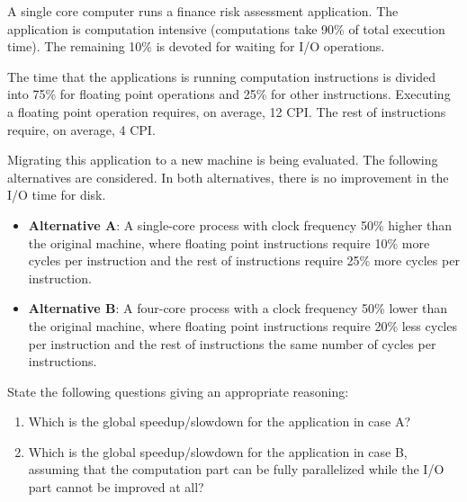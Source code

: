 \begin{acexercise}\end{acexercise}

A single core computer runs a finance risk assessment application. The
application is computation intensive (computations take 90\% of total 
execution time). The remaining 10\% is devoted for waiting for I/O operations.

The time that the applications is running computation instructions is divided into
75\% for floating point operations and 25\% for other instructions. Executing
a floating point operation requires, on average, 12 CPI. The rest of instructions
require, on average, 4 CPI.

Migrating this application to a new machine is being evaluated. The following
alternatives are considered. In both alternatives, there is no improvement in
the I/O time for disk.

\begin{itemize}
  \item \textbf{Alternative A}: 
        A single-core process with clock frequency 50\% higher than the original
        machine, where floating point instructions require 10\% more cycles per
        instruction and the rest of instructions require 25\% more cycles per
        instruction.

  \item \textbf{Alternative B}: 
        A four-core process with a clock frequency 50\% lower than the original
        machine, where floating point instructions require 20\% less cycles per
        instruction and the rest of instructions the same number of cycles per
        instructions.
\end{itemize}

State the following questions giving an appropriate reasoning:
\begin{enumerate}

  \item Which is the global speedup/slowdown for the application in case A?

  \item Which is the global speedup/slowdown for the application in case B,
        assuming that the computation part can be fully parallelized while
        the I/O part cannot be improved at all?
\end{enumerate}


\begin{acsolution}\end{acsolution}

